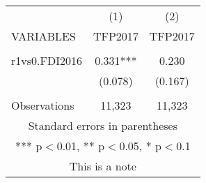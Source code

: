 \documentclass[]{article}
\begin{document}
\begin{tabular}{lcc} \hline
 & (1) & (2) \\
VARIABLES & TFP2017 & TFP2017 \\ \hline
 &  &  \\
r1vs0.FDI2016 & 0.331*** & 0.230 \\
 & (0.078) & (0.167) \\
 &  &  \\
 Observations & 11,323 & 11,323 \\ \hline
\multicolumn{3}{c}{ Standard errors in parentheses} \\
\multicolumn{3}{c}{ *** p$<$0.01, ** p$<$0.05, * p$<$0.1} \\
\multicolumn{3}{c}{ This is a note} \\
\end{tabular}
\end{document}
